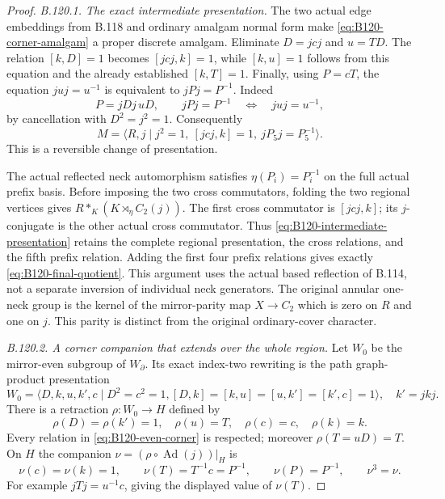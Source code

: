 \begin{proof}
\emph{B.120.1. The exact intermediate presentation.}
The two actual edge embeddings from B.118 and ordinary amalgam
normal form make \eqref{eq:B120-corner-amalgam} a proper discrete
amalgam. Eliminate $D=j c j$ and $u=T D$. The relation
$[k,D]=1$ becomes $[jcj,k]=1$, while $[k,u]=1$ follows from
this equation and the already established $[k,T]=1$. Finally,
using $P=cT$, the equation $juj=u^{-1}$ is equivalent to
$jPj=P^{-1}$. Indeed
\[
 P=jDj\,uD,
 \qquad jPj=P^{-1}
 \quad\Longleftrightarrow\quad juj=u^{-1},
\]
by cancellation with $D^2=j^2=1$. Consequently
\begin{equation}\label{eq:B120-intermediate-presentation}
 M=\langle R,j\mid j^2=1,\ [jcj,k]=1,\ jP_5j=P_5^{-1}\rangle.
\end{equation}
This is a reversible change of presentation.

The actual reflected neck automorphism satisfies
$\eta(P_i)=P_i^{-1}$ on the full actual prefix basis. Before
imposing the two cross commutators, folding the two regional
vertices gives $R*_{K}(K\rtimes_\eta C_2(j))$. The first cross
commutator is $[jcj,k]$; its $j$-conjugate is the other actual
cross commutator. Thus \eqref{eq:B120-intermediate-presentation}
retains the complete regional presentation, the cross relations,
and the fifth prefix relation. Adding the first four prefix
relations gives exactly \eqref{eq:B120-final-quotient}. This
argument uses the actual based reflection of B.114, not a separate
inversion of individual neck generators. The original annular
one-neck group is the kernel of the mirror-parity map $X\to C_2$
which is zero on $R$ and one on $j$. This parity is distinct from
the original ordinary-cover character.

\emph{B.120.2. A corner companion that extends over the whole region.}
Let $W_0$ be the mirror-even subgroup of $W_{\partial}$. Its exact
index-two rewriting is the path graph-product presentation
\begin{equation}\label{eq:B120-even-corner}
 W_0=\langle D,k,u,k',c\mid D^2=c^2=1,
 [D,k]=[k,u]=[u,k']=[k',c]=1\rangle,
 \quad k'=jkj.
\end{equation}
There is a retraction $\rho:W_0\to H$ defined by
\begin{equation}\label{eq:B120-corner-retraction}
 \rho(D)=\rho(k')=1,\quad
 \rho(u)=T,\quad\rho(c)=c,\quad\rho(k)=k.
\end{equation}
Every relation in \eqref{eq:B120-even-corner} is respected;
moreover $\rho(T=uD)=T$. On $H$ the companion
$\nu=(\rho\circ\operatorname{Ad}(j))|_H$ is
\begin{equation}\label{eq:B120-nu}
 \nu(c)=\nu(k)=1,\qquad
 \nu(T)=T^{-1}c=P^{-1},\qquad \nu(P)=P^{-1},\qquad \nu^3=\nu.
\end{equation}
For example $jTj=u^{-1}c$, giving the displayed value of $\nu(T)$.


\end{proof}
